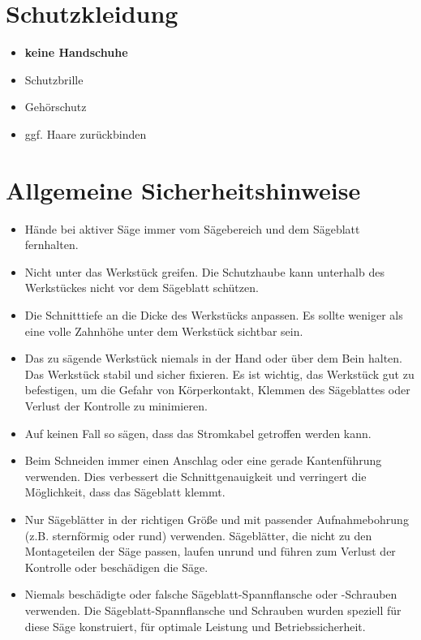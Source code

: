 \documentclass[10pt]{scrartcl}
\date{\vspace{-5ex}}
\title{\flushleft{FESTOOL Kreiss\"age CMS 75}}
\begin{document}
\maketitle
\thispagestyle{fancy}
\section{Schutzkleidung}
\begin{itemize}
\item \textbf{keine Handschuhe}
\item Schutzbrille
\item Gehörschutz
\item ggf. Haare zurückbinden 
\end{itemize}
\section{Allgemeine Sicherheitshinweise}
\begin{itemize}
\item Hände bei aktiver Säge immer vom Sägebereich und dem Sägeblatt fernhalten.

\item Nicht unter das Werkstück greifen. Die Schutzhaube kann unterhalb des Werkstückes nicht vor dem Sägeblatt schützen.

\item Die Schnitttiefe an die Dicke des Werkstücks anpassen. Es sollte weniger als eine volle Zahnhöhe unter dem Werkstück sichtbar sein.

\item Das zu sägende Werkstück niemals in der Hand oder über dem Bein halten. Das Werkstück stabil und sicher fixieren. Es ist wichtig, das Werkstück gut zu befestigen,
um die Gefahr von Körperkontakt, Klemmen des Sägeblattes oder Verlust der Kontrolle zu minimieren.

\item Auf keinen Fall so sägen, dass das Stromkabel getroffen werden kann. 

\item Beim Schneiden immer einen Anschlag oder eine gerade Kantenführung verwenden. Dies verbessert die Schnittgenauigkeit und verringert die Möglichkeit, dass das Sägeblatt klemmt.

\item Nur Sägeblätter in der richtigen Größe und mit passender Aufnahmebohrung (z.B. sternförmig oder rund) verwenden. Sägeblätter, die nicht zu den Montageteilen der Säge passen, laufen unrund und führen zum Verlust der Kontrolle oder beschädigen die Säge.

\item Niemals beschädigte oder falsche Sägeblatt-Spannflansche oder -Schrauben verwenden. Die Sägeblatt-Spannflansche und Schrauben wurden speziell für diese Säge konstruiert, für optimale Leistung und Betriebssicherheit.

\end{itemize}
\end{document}
